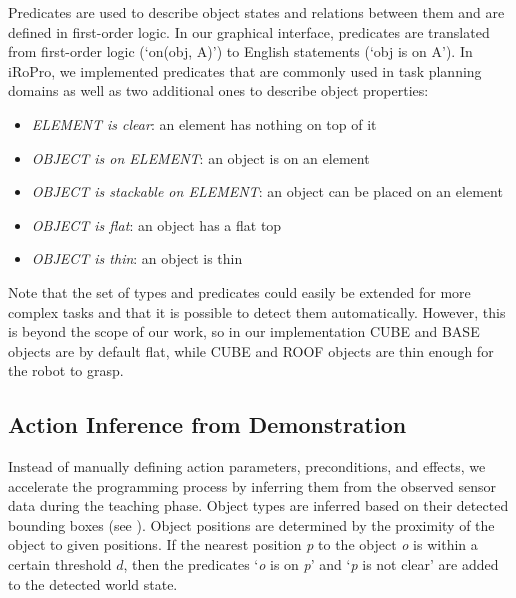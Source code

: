 Predicates are used to describe object states and relations between them and are defined in first-order logic.
In our graphical interface, predicates are translated from first-order logic (`on(obj, A)') to English statements (`obj is on A').
In iRoPro, we implemented predicates that are commonly used in task planning domains as well as two additional ones to describe object properties:
\begin{itemize}
    \item \textit{ELEMENT is clear}: an element has nothing on top of it
    \item \textit{OBJECT is on ELEMENT}: an object is on an element
    \item \textit{OBJECT is stackable on ELEMENT}: an object can be placed on an element
    \item \textit{OBJECT is flat}: an object has a flat top
    \item \textit{OBJECT is thin}: an object is thin
\end{itemize}
Note that the set of types and predicates could easily be extended for more complex tasks and that it is possible to detect them automatically.
However, this is beyond the scope of our work, so in our implementation CUBE and BASE objects are by default flat, while CUBE and ROOF objects are thin enough for the robot to grasp.



\subsection{Action Inference from Demonstration}
\label{sec:inference}
Instead of manually defining action parameters, preconditions, and effects, we accelerate the programming process by inferring them from the observed sensor data during the teaching phase.
Object types are inferred based on their detected bounding boxes (see ).
Object positions are determined by the proximity of the object to given positions.
If the nearest position \emph{p} to the object \emph{o} is within a certain threshold $d$, then the predicates `\emph{o} is on \emph{p}' and `\emph{p} is not clear' are added to the detected world state.

